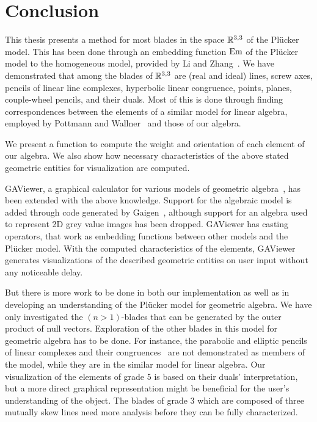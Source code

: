 \section{Conclusion}
\label{ch:conclusion}
This thesis presents a method for most blades in the space $\mathbb{R}^{3,3}$ of the Pl\"ucker model.  This has been done through an embedding function $\operatorname{Em}$ of the Pl\"ucker model to the homogeneous model, provided by Li and Zhang~\cite{Hongbo}.  We have demonstrated that among the blades of $\mathbb{R}^{3,3}$ are (real and ideal) lines, screw axes, pencils of linear line complexes, hyperbolic linear congruence, points, planes, couple-wheel pencils, and their duals.  Most of this is done through finding correspondences between the elements of a similar model for linear algebra, employed by Pottmann and Wallner~\cite{Pottmann} and those of our algebra.

We present a function to compute the weight and orientation of each element of our algebra.  We also show how necessary characteristics of the above stated geometric entities for visualization are computed.

GAViewer, a graphical calculator for various models of geometric algebra~\cite{GAViewer}, has been extended with the above knowledge.  Support for the algebraic model is added through code generated by Gaigen~\cite{Gaigen}, although support for an algebra used to represent 2D grey value images has been dropped.  GAViewer has casting operators, that work as embedding functions between other models and the Pl\"ucker model.  With the computed characteristics of the elements, GAViewer generates visualizations of the described geometric entities on user input without any noticeable delay.


But there is more work to be done in both our implementation as well as in developing an understanding of the Pl\"ucker model for geometric algebra.  We have only investigated the $(n>1)$-blades that can be generated by the outer product of null vectors.  Exploration of the other blades in this model for geometric algebra has to be done.  For instance, the parabolic and elliptic pencils of linear complexes and their congruences~\cite[Section 3.2.1]{Pottmann} are not demonstrated as members of the model, while they are in the similar model for linear algebra.  Our visualization of the elements of grade 5 is based on their duals' interpretation, but a more direct graphical representation might be beneficial for the user's understanding of the object.  The blades of grade 3 which are composed of three mutually skew lines need more analysis before they can be fully characterized.  

